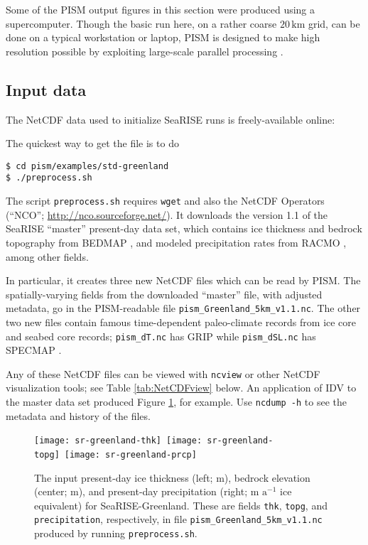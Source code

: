 Some of the PISM output figures in this section were produced using a supercomputer.  Though the basic run here, on a rather coarse $20\,\textrm{km}$ grid, can be done on a typical workstation or laptop, PISM is designed to make high resolution possible by exploiting large-scale parallel processing \cite[among many other examples]{AschwandenAdalgeirsdottirKhroulev,Golledgeetal2012,Golledgeetal2013}.


\subsection{Input data}

The NetCDF data used to initialize SeaRISE runs is freely-available online: 
\medskip

\centerline{}
\medskip

\noindent The quickest way to get the file is to do
\begin{verbatim}
$ cd pism/examples/std-greenland
$ ./preprocess.sh
\end{verbatim}
\noindent The script \texttt{preprocess.sh} requires \texttt{wget} and also the NetCDF Operators (``NCO''; \url{http://nco.sourceforge.net/}).  It downloads the version 1.1 of the SeaRISE ``master'' present-day data set, which contains ice thickness and bedrock topography from BEDMAP \cite{BamberLayberryGogenini}, and modeled precipitation rates from RACMO \cite{Ettemaetal2009}, among other fields.

In particular, it creates three new NetCDF files which can be read by PISM.  The spatially-varying fields from the downloaded ``master'' file, with adjusted metadata, go in the PISM-readable file \texttt{pism_Greenland_5km_v1.1.nc}.  The other two new files contain famous time-dependent paleo-climate records from ice core and seabed core records; \texttt{pism_dT.nc} has GRIP \cite{JohnsenetalGRIP} while \texttt{pism_dSL.nc} has SPECMAP \cite{Imbrieetal1984}.

Any of these NetCDF files can be viewed with \texttt{ncview} or other NetCDF visualization tools; see Table \ref{tab:NetCDFview} below.  An application of IDV to the master data set produced Figure \ref{fig:sr-input}, for example.  Use \texttt{ncdump -h} to see the metadata and history of the files.

\begin{figure}[ht]
\centering
\mbox{\texttt{[image: sr-greenland-thk]}
  \qquad
  \texttt{[image: sr-greenland-topg]}
  \qquad
  \texttt{[image: sr-greenland-prcp]}}
\caption{The input present-day ice thickness (left; m), bedrock elevation (center; m), and present-day precipitation (right; m $\text{a}^{-1}$ ice equivalent) for SeaRISE-Greenland.  These are fields \texttt{thk}, \texttt{topg}, and \texttt{precipitation}, respectively, in file \texttt{pism_Greenland_5km_v1.1.nc} produced by running \texttt{preprocess.sh}.}
\label{fig:sr-input}
\end{figure}


